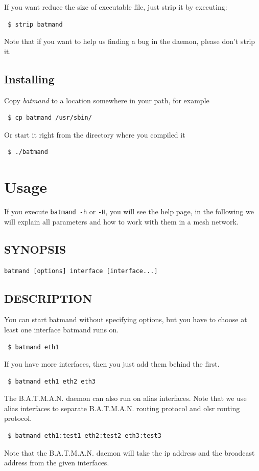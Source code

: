 \documentclass[
	12pt,
	a4paper,
	twoside,
	english,
	headsepline,
	footnosepline,
	automark,
	normalheadings,
	openany,
	cleardoubleplain,
	abstracton,
	idxtotoc,
	liststotoc,
	bibtotoc,
 	BCOR8mm,
]{scrartcl}
\begin{document}
If you want reduce the size of executable file, just strip it by executing: 

\begin{verbatim}
 $ strip batmand
\end{verbatim}

Note that if you want to help us finding a bug in the daemon, please don't strip
it.

\subsection{Installing}
Copy \emph{batmand} to a location somewhere in your path, for example
\begin{verbatim}
 $ cp batmand /usr/sbin/
\end{verbatim}
Or start it right from the directory where you compiled it
\begin{verbatim}
 $ ./batmand
\end{verbatim}


\section{Usage}
If you execute \verb+batmand -h+ or \verb+-H+, you will see the help page, in
the following we will explain all parameters and how to work with them in a mesh
network.

\subsection{SYNOPSIS}
\begin{verbatim}
batmand [options] interface [interface...]
\end{verbatim}


\subsection{DESCRIPTION}
You can start batmand without specifying options, but you have to choose at
least one interface batmand runs on.
\begin{verbatim}
 $ batmand eth1
\end{verbatim}
If you have more interfaces, then you just add them behind the first.
\begin{verbatim}
 $ batmand eth1 eth2 eth3
\end{verbatim}
The B.A.T.M.A.N. daemon can also run on alias interfaces. Note that we use alias
interfaces to separate B.A.T.M.A.N. routing protocol and olsr routing protocol.
\begin{verbatim}
 $ batmand eth1:test1 eth2:test2 eth3:test3
\end{verbatim}
Note that the B.A.T.M.A.N. daemon will take the ip address and the broadcast
address from the given interfaces.
\end{document}
